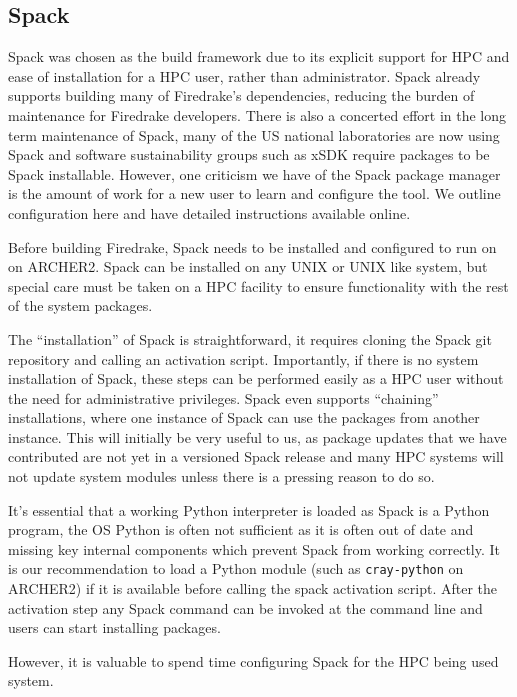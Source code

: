 \documentclass[a4paper,11pt]{article}
\begin{document}
\subsection{Spack}
\label{ssec:spack}
Spack was chosen as the build framework due to its explicit support for HPC and ease of installation for a HPC user, rather than administrator.
Spack already supports building many of Firedrake's dependencies, reducing the burden of maintenance for Firedrake developers.
There is also a concerted effort in the long term maintenance of Spack, many of the US national laboratories are now using Spack and software sustainability groups such as xSDK\cite{xSDK1,xSDK2} require packages to be Spack installable.
However, one criticism we have of the Spack package manager is the amount of work for a new user to learn and configure the tool.
We outline configuration here and have detailed instructions available online\cite{?}.

Before building Firedrake, Spack needs to be installed and configured to run on on ARCHER2.
Spack can be installed on any UNIX or UNIX like system, but special care must be taken on a HPC facility to ensure functionality with the rest of the system packages.

The ``installation'' of Spack is straightforward, it requires cloning the Spack git repository and calling an activation script.
Importantly, if there is no system installation of Spack, these steps can be performed easily as a HPC user without the need for administrative privileges.
Spack even supports ``chaining'' installations, where one instance of Spack can use the packages from another instance.
This will initially be very useful to us, as package updates that we have contributed are not yet in a versioned Spack release and many HPC systems will not update system modules unless there is a pressing reason to do so.

It's essential that a working Python interpreter is loaded as Spack is a Python program, the OS Python is often not sufficient as it is often out of date and missing key internal components which prevent Spack from working correctly.
It is our recommendation to load a Python module (such as \verb`cray-python` on ARCHER2) if it is available before calling the spack activation script.
After the activation step any Spack command can be invoked at the command line and users can start installing packages.

However, it is valuable to spend time configuring Spack for the HPC being used system.
\end{document}
